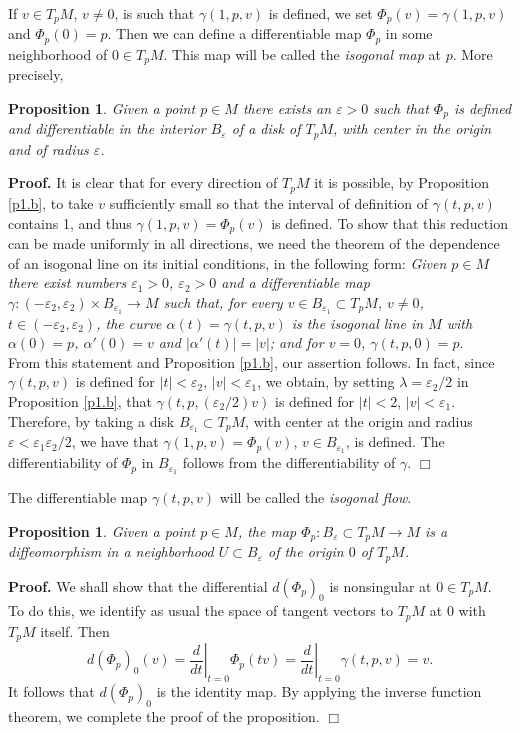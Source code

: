 \documentclass[11pt,a4paper]{article}
\def\e{\varepsilon}
\def\e{\varepsilon}
\def\e{\varepsilon}
\def\g{\gamma}
\newenvironment{proof}{\ignorespaces\par\noindent\textbf{Proof.}\quad}{\hfill$\Box$\par}
\newtheorem{prop}[theo]{Proposition}
\begin{document}
If $v\in T_pM$, $v\neq0$, is such that $\g(1,p,v)$ is defined, we set $\Phi_p(v)=\g(1,p,v)$ and $\Phi_p(0)=p$. Then we can define a differentiable map $\Phi_p$ in some neighborhood of $0\in T_pM$. This map will be called the \emph{isogonal map} at $p$. More precisely,

\begin{prop}\label{p1.c}
Given a point $p\in M$ there exists an $\e>0$ such that $\Phi_p$ is defined and differentiable in the interior $B_\e$ of a disk of $T_pM$, with center in the origin and of radius $\e$.
\end{prop}
\begin{proof}
It is clear that for every direction of $T_pM$ it is possible, by Proposition \ref{p1.b}, to take $v$ sufficiently small so that the interval of definition of $\g(t,p,v)$ contains 1, and thus $\g(1,p,v)=\Phi_p(v)$ is defined. To show that this reduction can be made uniformly in all directions, we need the theorem of the dependence of an  isogonal line on its initial conditions, in the following form: \emph{Given $p\in M$ there exist numbers $\e_1>0$, $\e_2>0$ and a differentiable map $\g:(-\e_2,\e_2)\times B_{\e_1}\to M$ such that, for every $v\in B_{\e_1}\subset T_pM$, $v\neq0$, $t\in(-\e_2,\e_2)$, the curve $\alpha(t)=\g(t,p,v)$ is the  isogonal line in $M$ with $\alpha(0)=p$, $\alpha'(0)=v$ and $|\alpha'(t)|=|v|$; and for $v=0$, $\g(t,p,0)=p$}.\\
From this statement and Proposition \ref{p1.b}, our assertion follows. In fact, since $\g(t,p,v)$ is defined for $|t|<\e_2$, $|v|<\e_1$, we obtain, by setting $\lambda=\e_2/2$ in Proposition \ref{p1.b}, that $\g(t,p,(\e_2/2)v)$ is defined for $|t|<2$, $|v|<\e_1$. Therefore, by taking a disk $B_{\e_1}\subset T_pM$, with center at the origin and radius $\e<\e_1\e_2/2$, we have that $\g(1,p,v)=\Phi_p(v)$, $v\in B_{\e_1}$, is defined. The differentiability of $\Phi_p$ in $B_{\e_1}$ follows from the differentiability of $\g$.
\end{proof}
The differentiable map $\g(t,p,v)$ will be called the \emph{isogonal flow}.

\begin{prop}\label{p1.d}
Given a point $p\in M$, the map $\Phi_p:B_\e\subset T_pM\to M$ is a diffeomorphism in a neighborhood $U\subset B_\e$ of the origin $0$ of $T_pM$.
\end{prop}
\begin{proof}
We shall show that the differential $d(\Phi_p)_0$ is nonsingular at $0\in T_pM$. To do this, we identify as usual the space of tangent vectors to $T_pM$ at $0$ with $T_pM$ itself. Then
\[
d(\Phi_p)_0(v)=\left.\frac{d}{dt}\right|_{t=0}\Phi_p(tv)=\left.\frac{d}{dt}\right|_{t=0}\g(t,p,v)=v.
\]
It follows that $d(\Phi_p)_0$ is the identity map. By applying the inverse function theorem, we complete the proof of the proposition.
\end{proof}
\medskip
\end{document}
